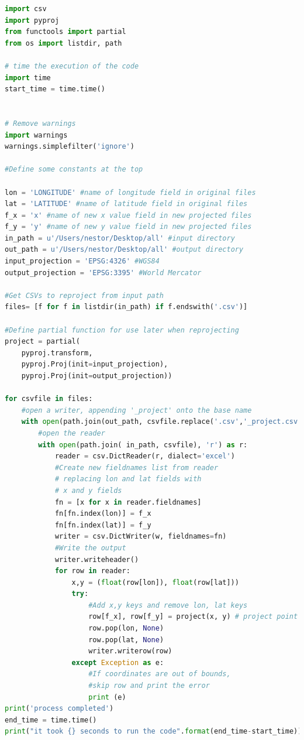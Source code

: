 \documentclass[a4paper , 12pt]{book}
\begin{document}
\begin{center}
\begin{lstlisting}[language=Python, frame=single]
import csv
import pyproj
from functools import partial
from os import listdir, path

# time the execution of the code
import time
start_time = time.time()


# Remove warnings
import warnings
warnings.simplefilter('ignore')

#Define some constants at the top

lon = 'LONGITUDE' #name of longitude field in original files
lat = 'LATITUDE' #name of latitude field in original files
f_x = 'x' #name of new x value field in new projected files
f_y = 'y' #name of new y value field in new projected files
in_path = u'/Users/nestor/Desktop/all' #input directory
out_path = u'/Users/nestor/Desktop/all' #output directory
input_projection = 'EPSG:4326' #WGS84
output_projection = 'EPSG:3395' #World Mercator

#Get CSVs to reproject from input path
files= [f for f in listdir(in_path) if f.endswith('.csv')]

#Define partial function for use later when reprojecting
project = partial(
    pyproj.transform,
    pyproj.Proj(init=input_projection),
    pyproj.Proj(init=output_projection))

for csvfile in files:
    #open a writer, appending '_project' onto the base name
    with open(path.join(out_path, csvfile.replace('.csv','_project.csv')), 'w') as w:
        #open the reader
        with open(path.join( in_path, csvfile), 'r') as r:
            reader = csv.DictReader(r, dialect='excel')
            #Create new fieldnames list from reader
            # replacing lon and lat fields with 
            # x and y fields
            fn = [x for x in reader.fieldnames]
            fn[fn.index(lon)] = f_x
            fn[fn.index(lat)] = f_y
            writer = csv.DictWriter(w, fieldnames=fn)
            #Write the output
            writer.writeheader()
            for row in reader:
                x,y = (float(row[lon]), float(row[lat]))
                try:
                    #Add x,y keys and remove lon, lat keys
                    row[f_x], row[f_y] = project(x, y) # project point
                    row.pop(lon, None)
                    row.pop(lat, None)
                    writer.writerow(row)
                except Exception as e:
                    #If coordinates are out of bounds, 
                    #skip row and print the error
                    print (e)
print('process completed')
end_time = time.time()
print("it took {} seconds to run the code".format(end_time-start_time))
\end{lstlisting}
\end{center}
\end{document}
